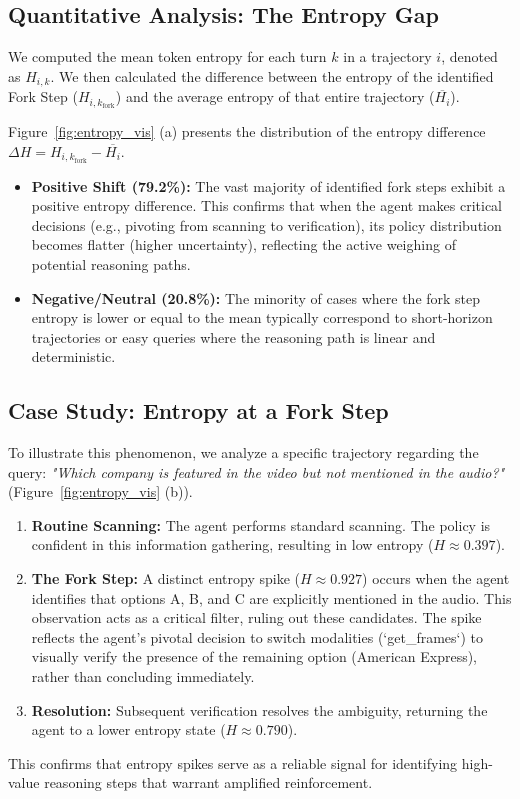 \documentclass{article}
\theoremstyle{plain}
\theoremstyle{definition}
\theoremstyle{remark}
\begin{document}
\subsection{Quantitative Analysis: The Entropy Gap}
We computed the mean token entropy for each turn $k$ in a trajectory $i$, denoted as $H_{i,k}$. We then calculated the difference between the entropy of the identified Fork Step ($H_{i, k_{\text{fork}}}$) and the average entropy of that entire trajectory ($\overline{H_i}$).

Figure~\ref{fig:entropy_vis} (a) presents the distribution of the entropy difference $\Delta H = H_{i, k_{\text{fork}}} - \overline{H_i}$.
\begin{itemize}
    \item \textbf{Positive Shift (79.2\%):} The vast majority of identified fork steps exhibit a positive entropy difference. This confirms that when the agent makes critical decisions (e.g., pivoting from scanning to verification), its policy distribution becomes flatter (higher uncertainty), reflecting the active weighing of potential reasoning paths.
    \item \textbf{Negative/Neutral (20.8\%):} The minority of cases where the fork step entropy is lower or equal to the mean typically correspond to short-horizon trajectories or easy queries where the reasoning path is linear and deterministic.
\end{itemize}

\subsection{Case Study: Entropy at a Fork Step}
To illustrate this phenomenon, we analyze a specific trajectory regarding the query: \textit{"Which company is featured in the video but not mentioned in the audio?"} (Figure~\ref{fig:entropy_vis} (b)).
\begin{enumerate}
    \item \textbf{Routine Scanning:} The agent performs standard scanning. The policy is confident in this information gathering, resulting in low entropy ($H \approx 0.397$).
    \item \textbf{The Fork Step:} A distinct entropy spike ($H \approx 0.927$) occurs when the agent identifies that options A, B, and C are explicitly mentioned in the audio. This observation acts as a critical filter, ruling out these candidates. The spike reflects the agent's pivotal decision to switch modalities (`get\_frames`) to visually verify the presence of the remaining option (American Express), rather than concluding immediately.
    \item \textbf{Resolution:} Subsequent verification resolves the ambiguity, returning the agent to a lower entropy state ($H \approx 0.790$).
\end{enumerate}
This confirms that entropy spikes serve as a reliable signal for identifying high-value reasoning steps that warrant amplified reinforcement.
\end{document}
